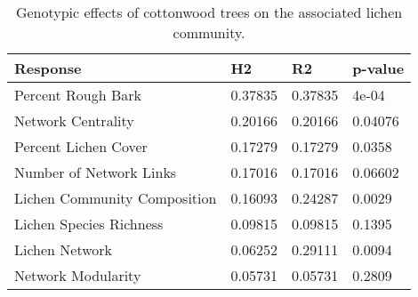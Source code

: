 \begin{table}[ht]
\centering
\begin{tabular}{llll}
  \hline
Response & H2 & R2 & p-value \\ 
  \hline
Percent Rough Bark & 0.37835 & 0.37835 & 4e-04 \\ 
  Network Centrality & 0.20166 & 0.20166 & 0.04076 \\ 
  Percent Lichen Cover & 0.17279 & 0.17279 & 0.0358 \\ 
  Number of Network Links & 0.17016 & 0.17016 & 0.06602 \\ 
  Lichen Community Composition & 0.16093 & 0.24287 & 0.0029 \\ 
  Lichen Species Richness & 0.09815 & 0.09815 & 0.1395 \\ 
  Lichen Network & 0.06252 & 0.29111 & 0.0094 \\ 
  Network Modularity & 0.05731 & 0.05731 & 0.2809 \\ 
   \hline
\end{tabular}
\caption{Genotypic effects of cottonwood trees on the associated lichen community.} 
\label{tab:h2_table}
\end{table}
